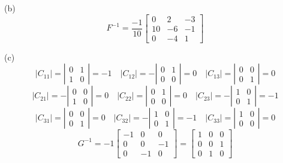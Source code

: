 \documentclass{./../../Latex/homework}
\begin{document}
\begin{enumerate}
(b)
$$
F^{-1}=\frac{-1}{10}\left[\begin{array}{ccc}
0 & 2 & -3 \\
10 & -6 & -1 \\
0 & -4 & 1
\end{array}\right]
$$

(c)
$$ \left|C_{11}\right|=\left|\begin{array}{ll}0 & 1 \\ 1 & 0\end{array}\right|=-1 
\quad  \left|C_{12}\right|=-\left|\begin{array}{ll}0 & 1 \\ 0 & 0\end{array}\right|=0 
\quad  \left|C_{13}\right|=\left|\begin{array}{ll}0 & 0 \\ 0 & 1\end{array}\right|=0 
$$
$$ \left|C_{21}\right|=-\left|\begin{array}{ll}0 & 0 \\ 1 & 0\end{array}\right|=0 
\quad  \left|C_{22}\right|=\left|\begin{array}{ll}0 & 1 \\ 0 & 0\end{array}\right|=0 
\quad  \left|C_{23}\right|=-\left|\begin{array}{ll}1 & 0 \\ 0 & 1\end{array}\right|=-1 $$
$$
\left|C_{31}\right|=\left|\begin{array}{cc}
0 & 0 \\
0 & 1
\end{array}\right|=0 \quad\left|C_{32}\right|=-\left|\begin{array}{cc}
1 & 0 \\
0 & 1
\end{array}\right|=-1 \quad\left|C_{33}\right|=\left|\begin{array}{ll}
1 & 0 \\
0 & 0
\end{array}\right|=0
$$
$$ G^{-1}=-1\left[\begin{array}{ccc}-1 & 0 & 0 \\ 0 & 0 & -1 \\ 0 & -1 & 0\end{array}\right]=\left[\begin{array}{lll}1 & 0 & 0 \\ 0 & 0 & 1 \\ 0 & 1 & 0\end{array}\right] $$ \\


\end{enumerate}
\end{document}
